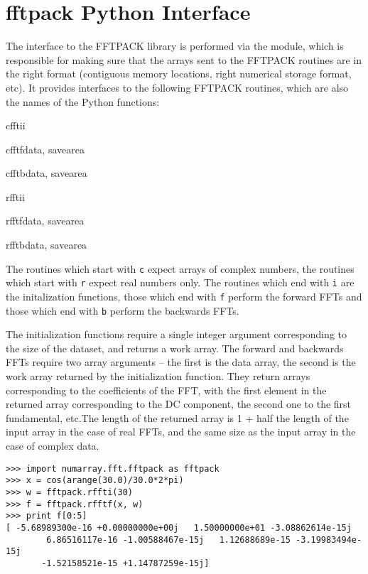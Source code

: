             
\section{fftpack Python Interface}
\label{sec:FFT:c-api}

\makeatletter \py@reset \makeatother

The interface to the FFTPACK library is performed via the 
module, which is responsible for making sure that the arrays sent to the
FFTPACK routines are in the right format (contiguous memory locations, right
numerical storage format, etc). It provides interfaces to the following FFTPACK
routines, which are also the names of the Python functions:
\begin{funcdesc}{cffti}{i}
\end{funcdesc}
\begin{funcdesc}{cfftf}{data, savearea}
\end{funcdesc}
\begin{funcdesc}{cfftb}{data, savearea}
\end{funcdesc}
\begin{funcdesc}{rffti}{i}
\end{funcdesc}
\begin{funcdesc}{rfftf}{data, savearea}
\end{funcdesc}
\begin{funcdesc}{rfftb}{data, savearea}
\end{funcdesc}
The routines which start with \texttt{c} expect arrays of complex numbers, the
routines which start with \texttt{r} expect real numbers only. The routines
which end with \texttt{i} are the initalization functions, those which end with
\texttt{f} perform the forward FFTs and those which end with \texttt{b} perform
the backwards FFTs.

The initialization functions require a single integer argument corresponding to
the size of the dataset, and returns a work array. The forward and backwards
FFTs require two array arguments -- the first is the data array, the second is
the work array returned by the initialization function. They return arrays
corresponding to the coefficients of the FFT, with the first element in the
returned array corresponding to the DC component, the second one to the first
fundamental, etc.The length of the returned array is 1 + half the length of the
input array in the case of real FFTs, and the same size as the input array in
the case of complex data.
\begin{verbatim}
>>> import numarray.fft.fftpack as fftpack
>>> x = cos(arange(30.0)/30.0*2*pi)
>>> w = fftpack.rffti(30)
>>> f = fftpack.rfftf(x, w)
>>> print f[0:5]
[ -5.68989300e-16 +0.00000000e+00j   1.50000000e+01 -3.08862614e-15j
        6.86516117e-16 -1.00588467e-15j   1.12688689e-15 -3.19983494e-15j
       -1.52158521e-15 +1.14787259e-15j]
\end{verbatim}



